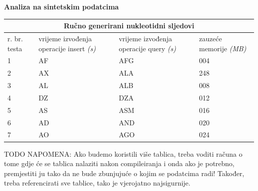 \documentclass[times, utf8, seminar, numeric]{fer}
\begin{document}
\begin{flushleft}
\textbf{Analiza na sintetskim podatcima}
\end{flushleft}

\begin{tabular}
{ |p{0.8cm}||p{4cm}|p{4cm}|p{4cm}|  }
 \hline
 \multicolumn{4}{|c|}{Ručno generirani nukleotidni sljedovi} \\
 \hline
 r. br. testa& vrijeme izvođenja operacije insert \textit{(s)} & vrijeme izvođenja operacije query \textit{(s)} &zauzeće memorije \textit{(MB)}\\
 \hline
 1& AF    &AFG&   004\\
 2&   AX  & ALA   &248\\
 3&AL & ALB&  008\\
 4&DZ & DZA&  012\\
 5&   AS  & ASM&016\\
 6& AD  & AND   &020\\
 7& AO  & AGO&024\\
 \hline
\end{tabular}

\vspace{10mm} 

TODO NAPOMENA: Ako budemo koristili više tablica, treba voditi računa o tome gdje će se tablica nalaziti nakon compileiranja i onda ako je potrebno, premjestiti ju tako da ne bude zbunjujuće o kojim se podatcima radi! Također, treba referencirati sve tablice, tako je vjerojatno najsigurnije.
\end{document}
